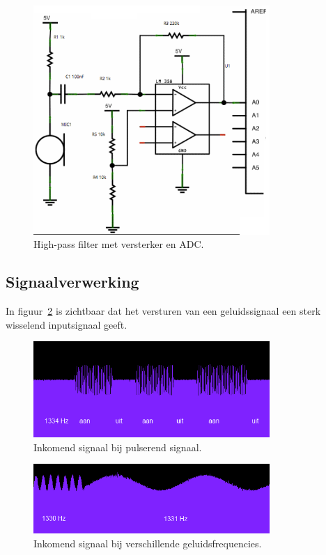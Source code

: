 \documentclass[a4paper,10pt]{article}
\begin{document}
\begin{figure}[ht!]
    \centering
    \includegraphics[width=0.8\textwidth]{high_pass_filter_circuit.png}
    \caption{High-pass filter met versterker en ADC.}
    \label{fig:circuit}
\end{figure}


\subsection{Signaalverwerking}
In figuur~\ref{fig:on_off} is zichtbaar dat het versturen van een geluidssignaal een sterk wisselend inputsignaal geeft.
\begin{figure}[ht!]
    \centering
    \includegraphics[width=0.8\textwidth]{resonance_on_off_commit_ff82f.png}
    \caption{Inkomend signaal bij pulserend signaal.}
    \label{fig:on_off}
\end{figure}

\begin{figure}[ht!]
    \centering
    \includegraphics[width=0.8\textwidth]{resonance_2_frequencies_commit_ff82f.png}
    \caption{Inkomend signaal bij verschillende geluidsfrequencies.}
    \label{fig:resonance}
\end{figure}

% 



\end{document}
